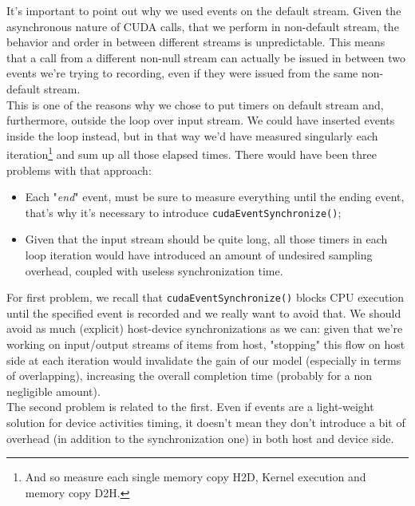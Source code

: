 It's important to point out why we used events on the default stream. 
Given the asynchronous nature of CUDA calls, that we perform in non-default stream, the behavior and order in between different streams is unpredictable. This means that a call from a different non-null stream can actually be issued in between two events we're trying to recording, even if they were issued from the same non-default stream\cite{cudaguide}.\\
This is one of the reasons why we chose to put timers on default stream and, furthermore, outside the loop over input stream.
We could have inserted events inside the loop instead, but in that way we'd have measured singularly each iteration\footnote{And so measure each single memory copy H2D, Kernel execution and memory copy D2H.} and sum up all those elapsed times.
There would have been three problems with that approach:
\begin{itemize}
	\item Each "\textit{end}" event, must be sure to measure everything until the ending event, that's why it's necessary to introduce \texttt{cudaEventSynchronize()};
	\item Given that the input stream should be quite long, all those timers in each loop iteration would have introduced an amount of undesired sampling overhead, coupled with useless synchronization time.
\end{itemize}

For first problem, we recall that \texttt{cudaEventSynchronize()} blocks CPU execution until the specified event is recorded and we really want to avoid that.
We should avoid as much (explicit) host-device synchronizations as we can: given that we're working on input/output streams of items from host, "stopping" this flow on host side at each iteration would invalidate the gain of our model (especially in terms of overlapping), increasing the overall completion time (probably for a non negligible amount).\\
The second problem is related to the first. Even if events are a light-weight solution for device activities timing, it doesn't mean they don't introduce a bit of overhead (in addition to the synchronization one) in both host and device side.

